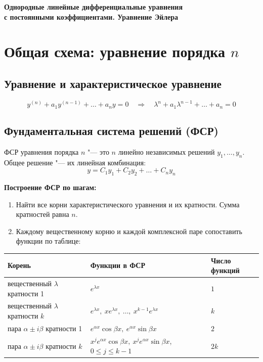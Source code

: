 \documentclass[11pt,a4paper]{article}
\begin{document}
\begin{center}
{\Large\bfseries Однородные линейные дифференциальные уравнения\\[2pt] с постоянными коэффициентами. Уравнение Эйлера}
\end{center}

\section*{Общая схема: уравнение порядка $n$}

\subsection*{Уравнение и характеристическое уравнение}

\[
  y^{(n)} + a_1 y^{(n-1)} + \dots + a_n y = 0
  \quad\Rightarrow\quad
  \lambda^n + a_1\lambda^{n-1} + \dots + a_n = 0
\]

\subsection*{Фундаментальная система решений (ФСР)}

ФСР уравнения порядка $n$ "--- это $n$ линейно независимых решений $y_1, \dots, y_n$. 
Общее решение "--- их линейная комбинация:
\[
  y = C_1 y_1 + C_2 y_2 + \dots + C_n y_n
\]

\textbf{Построение ФСР по шагам:}

\begin{enumerate}
  \item Найти все корни характеристического уравнения и их кратности. Сумма кратностей равна $n$.
  \item Каждому вещественному корню и каждой комплексной паре сопоставить функции по таблице:
\end{enumerate}

\begin{center}
\begin{tabular}{@{}lll@{}}
\toprule
Корень & Функции в ФСР & Число функций\\
\midrule
вещественный $\lambda$ кратности 1 & $e^{\lambda x}$ & $1$\\
вещественный $\lambda$ кратности $k$ & $e^{\lambda x},\ x e^{\lambda x},\ \dots,\ x^{k-1}e^{\lambda x}$ & $k$\\
пара $\alpha \pm i\beta$ кратности 1 & $e^{\alpha x}\cos\beta x,\ e^{\alpha x}\sin\beta x$ & $2$\\
пара $\alpha \pm i\beta$ кратности $k$ & $x^j e^{\alpha x}\cos\beta x,\ x^j e^{\alpha x}\sin\beta x$, \ $0 \le j \le k-1$ & $2k$\\
\bottomrule
\end{tabular}
\end{center}
\end{document}
